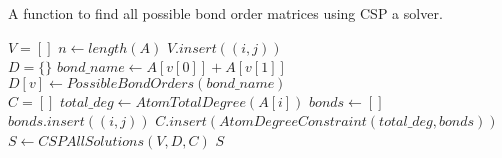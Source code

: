 \begin{algorithm}
\caption{A function to find all possible bond order matrices using CSP a solver.}
\label{alg:CSPSolveBondMatrix}
\begin{algorithmic}[1]


        \State $V = []$ 
        \State $n \gets length(A)$
                    \State $V.insert((i, j))$
                \EndIf
            \EndFor
        \EndFor
        \\
        \State $D = \{\}$ 
            \State $bond\_name \gets A[v[0]] + A[v[1]]$
            \State $D[v] \gets PossibleBondOrders(bond\_name)$
        \EndFor
        \\
        \State $C = []$ 
            \State $total\_deg \gets AtomTotalDegree(A[i])$
            \State $bonds \gets []$
                \State $bonds.insert((i, j))$
            \EndFor
            \State $C.insert(AtomDegreeConstraint(total\_deg, bonds))$
        \EndFor
        \State $S \gets CSPAllSolutions(V, D, C)$
        \State \Return $S$
    \EndProcedure
\end{algorithmic}
\end{algorithm}